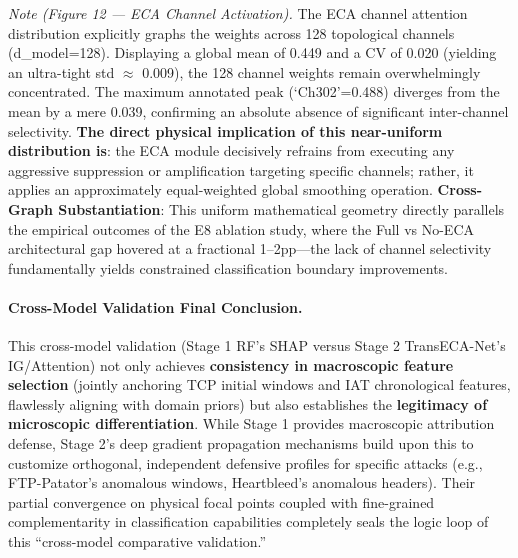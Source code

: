 \documentclass[sigconf]{acmart}
\begin{document}
\textit{Note (Figure 12 --- ECA Channel Activation).} The ECA channel attention distribution explicitly graphs the weights across 128 topological channels (d\_model=128). Displaying a global mean of 0.449 and a CV of 0.020 (yielding an ultra-tight std $\approx$ 0.009), the 128 channel weights remain overwhelmingly concentrated. The maximum annotated peak (`Ch302'=0.488) diverges from the mean by a mere 0.039, confirming an absolute absence of significant inter-channel selectivity. \textbf{The direct physical implication of this near-uniform distribution is}: the ECA module decisively refrains from executing any aggressive suppression or amplification targeting specific channels; rather, it applies an approximately equal-weighted global smoothing operation. \textbf{Cross-Graph Substantiation}: This uniform mathematical geometry directly parallels the empirical outcomes of the E8 ablation study, where the Full vs No-ECA architectural gap hovered at a fractional 1--2pp---the lack of channel selectivity fundamentally yields constrained classification boundary improvements.

\paragraph{Cross-Model Validation Final Conclusion.}
This cross-model validation (Stage 1 RF's SHAP versus Stage 2 TransECA-Net's IG/Attention) not only achieves \textbf{consistency in macroscopic feature selection} (jointly anchoring TCP initial windows and IAT chronological features, flawlessly aligning with domain priors) but also establishes the \textbf{legitimacy of microscopic differentiation}. While Stage 1 provides macroscopic attribution defense, Stage 2's deep gradient propagation mechanisms build upon this to customize orthogonal, independent defensive profiles for specific attacks (e.g., FTP-Patator's anomalous windows, Heartbleed's anomalous headers). Their partial convergence on physical focal points coupled with fine-grained complementarity in classification capabilities completely seals the logic loop of this ``cross-model comparative validation.''
\end{document}
